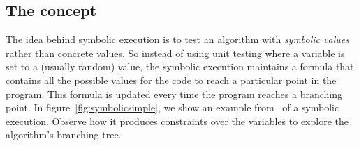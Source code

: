 \documentclass[11pt]{IEEEtran}
\makeatletter
\newcommand{\removelatexerror}{\let\@latex@error\@gobble}
\makeatother
\begin{document}
    \subsection{The concept}
      The idea behind symbolic execution is to test an algorithm with \emph{symbolic values} rather than concrete values. So instead of using unit testing where a variable is set to a (usually random) value, the symbolic execution maintains a formula that contains all the possible values for the code to reach a particular point in the program. This formula is updated every time the program reaches a branching point. In figure~\ref{fig:symbolicsimple}, we show an example from~\cite{visserWillemCorina} of a symbolic execution. Observe how it produces constraints over the variables to explore the algorithm's branching tree.
      \begin{figure}
%	
%

\end{figure}
\end{document}
